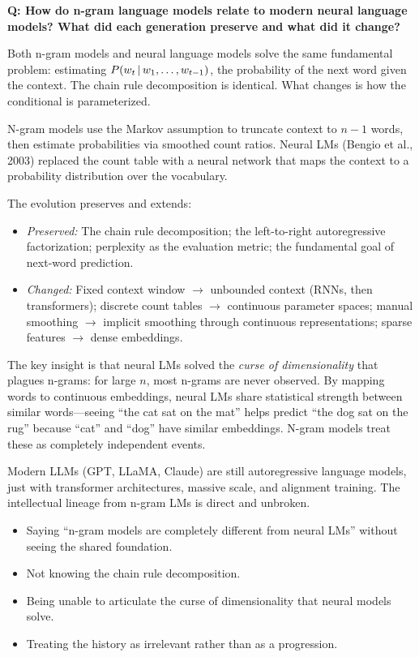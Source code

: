 \begin{interviewq}
\textbf{Q: How do n-gram language models relate to modern neural language
models?  What did each generation preserve and what did it change?}

 \quad {} \quad \badgefreq{\freqmed}

\stronganswer
Both n-gram models and neural language models solve the same fundamental
problem: estimating $P(w_t \,|\, w_1, \ldots, w_{t-1})$, the probability of
the next word given the context.  The chain rule decomposition is identical.
What changes is how the conditional is parameterized.

N-gram models use the Markov assumption to truncate context to $n{-}1$ words,
then estimate probabilities via smoothed count ratios.  Neural LMs (Bengio
et al., 2003) replaced the count table with a neural network that maps the
context to a probability distribution over the vocabulary.

The evolution preserves and extends:
\begin{itemize}
    \item \emph{Preserved:} The chain rule decomposition; the left-to-right
    autoregressive factorization; perplexity as the evaluation metric;
    the fundamental goal of next-word prediction.
    \item \emph{Changed:} Fixed context window $\to$ unbounded context (RNNs,
    then transformers); discrete count tables $\to$ continuous parameter
    spaces; manual smoothing $\to$ implicit smoothing through continuous
    representations; sparse features $\to$ dense embeddings.
\end{itemize}

The key insight is that neural LMs solved the \emph{curse of dimensionality}
that plagues n-grams: for large $n$, most n-grams are never observed.
By mapping words to continuous embeddings, neural LMs share statistical
strength between similar words---seeing ``the cat sat on the mat'' helps
predict ``the dog sat on the rug'' because ``cat'' and ``dog'' have similar
embeddings.  N-gram models treat these as completely independent events.

Modern LLMs (GPT, LLaMA, Claude) are still autoregressive language models,
just with transformer architectures, massive scale, and alignment training.
The intellectual lineage from n-gram LMs is direct and unbroken.

\redflags
\begin{itemize}
    \item Saying ``n-gram models are completely different from neural LMs''
          without seeing the shared foundation.
    \item Not knowing the chain rule decomposition.
    \item Being unable to articulate the curse of dimensionality that neural
          models solve.
    \item Treating the history as irrelevant rather than as a progression.
\end{itemize}


\end{interviewq}
